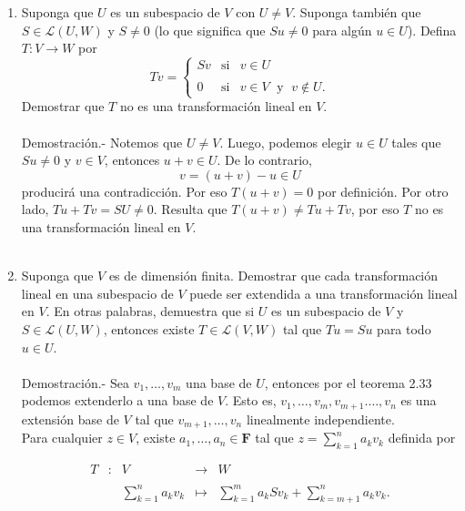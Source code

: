\begin{enumerate}[\bfseries 1.]
    \item Suponga que $U$ es un subespacio de $V$ con $U\neq V$. Suponga también que $S\in \mathcal{L}(U,W)$ y $S\neq 0$ (lo que significa que $Su\neq 0$ para algún $u\in U$). Defina $T:V\to W$ por
    $$
    Tv = 
    \left\{
	\begin{array}{rcl}
	    Sv &\mbox{si} & v\in U\\\\
	    0 &\mbox{si} & v\in V \;\mbox{ y }\;v\notin U.
	\end{array}
    \right.
    $$
    Demostrar que $T$ no es una transformación lineal en $V$.\\\\
	Demostración.-\; Notemos que $U\neq V$. Luego, podemos elegir $u\in U$ tales que $Su\neq 0$ y $v\in V$, entonces $u+v\in U$. De lo contrario,
	$$v=(u+v)-u\in U$$
	producirá una contradicción. Por eso $T(u+v)=0$ por definición. Por otro lado, $Tu+Tv=SU\neq 0$. Resulta que $T(u+v)\neq Tu+Tv$, por eso $T$ no es una transformación lineal en $V$.\\\\

    \item Suponga que $V$ es de dimensión finita. Demostrar que cada transformación lineal en una subespacio de $V$ puede ser extendida a una transformación lineal en $V$. En otras palabras, demuestra que si $U$ es un subespacio de $V$ y $S\in \mathcal{L}(U,W)$, entonces existe $T\in \mathcal{L}(V,W)$ tal que $Tu=Su$ para todo $u\in U$.\\\\
	Demostración.-\; Sea $v_1,\ldots,v_m$ una base de $U$, entonces por el teorema 2.33 podemos extenderlo a una base de $V$. Esto es, $v_1,\ldots,v_m,v_{m+1}.\ldots,v_n$ es una extensión base de $V$ tal que $v_{m+1},\ldots,v_n$ linealmente independiente.\\
	Para cualquier $z\in V$, existe $a_1,\ldots,a_n\in \textbf{F}$ tal que $z=\sum_{k=1}^n a_kv_k$ definida por

	$$
	\begin{array}{rcrcl}
	    T&:&V&\to & W\\\\
	     &&\displaystyle\sum_{k=1}^n a_kv_k &\mapsto & \displaystyle\sum_{k=1}^m a_kSv_k+\displaystyle\sum_{k=m+1}^n a_kv_k.
	\end{array}
	$$


\end{enumerate}
